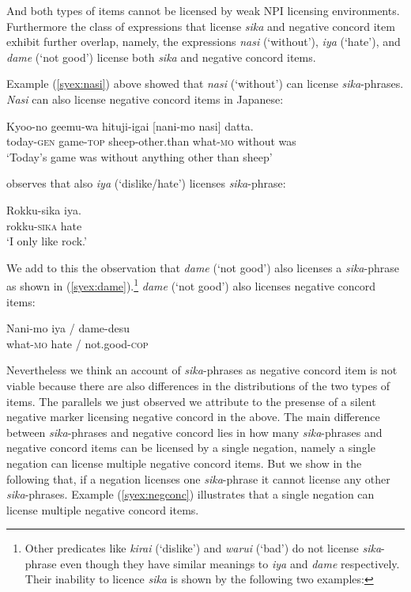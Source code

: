 \documentclass[output=paper]{langscibook}
\begin{document}
And both types of items cannot be licensed by weak NPI licensing environments.  Furthermore the class of expressions that license \emph{sika} and negative concord item exhibit further overlap, namely, the expressions \emph{nasi} (`without'), \emph{iya} (`hate'), and \emph{dame} (`not good') license both \emph{sika} and negative concord items.

Example (\ref{syex:nasi}) above showed that \emph{nasi} (`without') can license \emph{sika}-phrases.  \emph{Nasi} can also license negative concord items in Japanese:

\ea \gll Kyoo-no geemu-wa hituji-igai [nani-mo nasi] datta.\\
today-\textsc{gen} game-\textsc{top} sheep-other.than what-\textsc{mo} without was\\
\glt `Today's game was without anything other than sheep'\z


\citet{hasegawa11a} observes that also \emph{iya} (`dislike/hate')  licenses \emph{sika}-phrase:

\ea \gll Rokku-sika iya.\\
rokku-\textsc{sika} hate \\
\glt `I only like rock.'\z

We add to this the observation that  \emph{dame} (`not good') also licenses a \emph{sika}-phrase as shown in (\ref{syex:dame}).\footnote{Other predicates like \emph{kirai} (`dislike') and \emph{warui} (`bad') do not license \emph{sika}-phrase even though they have similar meanings to \emph{iya} and \emph{dame} respectively.
Their inability to licence \emph{sika} is shown by the following two examples:

\z
}
\emph{dame} (`not good') also licenses negative concord items:

\ea \label{syex:dame}
   \gll Nani-mo iya / dame-desu\\
   what-\textsc{mo} hate / not.good-\textsc{cop}\\\z

Nevertheless we think an account of \emph{sika}-phrases as negative concord item is not viable because there are also differences in the distributions of the two types of items.  
The parallels we just observed we attribute to the presense of a silent negative marker licensing negative concord in the above.
The main difference between \emph{sika}-phrases and negative concord lies in how many \emph{sika}-phrases and  negative concord items can be licensed by a single negation, namely a single negation can license multiple negative concord items.  
But we show in the following that, if a negation licenses one \emph{sika}-phrase it cannot license any other \emph{sika}-phrases.  
Example (\ref{syex:negconc}) illustrates that a single negation can license multiple negative concord items.
\end{document}
